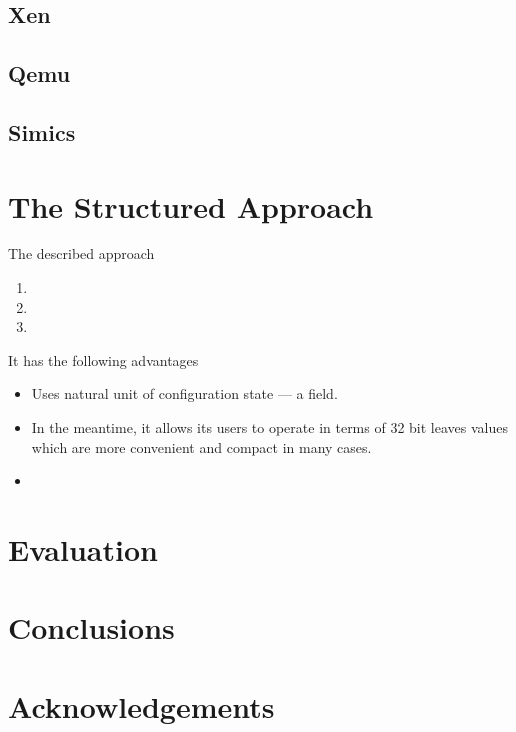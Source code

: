 \documentclass[a4paper,10pt,oneside,unicode]{article}
\begin{document}
\subsection{Xen}

\subsection{Qemu}

\subsection{Simics}

\section{The Structured Approach}

The described approach

\begin{enumerate}
\item
\item
\item
\end{enumerate}

It has the following advantages

\begin{itemize}
\item Uses natural unit of configuration state --- a field.
\item In the meantime, it allows its users to operate in terms of 32 bit leaves values which are more convenient and compact in many cases.
\item
\end{itemize}


\section{Evaluation}

\section{Conclusions}

\section{Acknowledgements}


\end{document}
